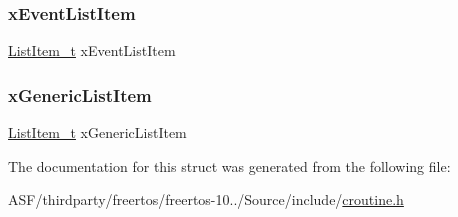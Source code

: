 \subsubsection{\texorpdfstring{xEventListItem}{xEventListItem}}
{\footnotesize\ttfamily \mbox{\hyperlink{list_8h_a1a62d469392f9bfe2443e7efab9c8398}{List\+Item\+\_\+t}} x\+Event\+List\+Item}

\mbox{\label{structcor_co_routine_control_block_ad91115e6e382ba8961310c4559abc7d2}} 
\subsubsection{\texorpdfstring{xGenericListItem}{xGenericListItem}}
{\footnotesize\ttfamily \mbox{\hyperlink{list_8h_a1a62d469392f9bfe2443e7efab9c8398}{List\+Item\+\_\+t}} x\+Generic\+List\+Item}



The documentation for this struct was generated from the following file\+:\begin{DoxyCompactItemize}
\item 
A\+S\+F/thirdparty/freertos/freertos-\/10../\+Source/include/\mbox{\hyperlink{croutine_8h}{croutine.\+h}}\end{DoxyCompactItemize}
